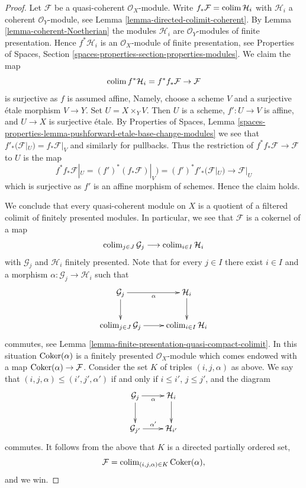 \begin{proof}
Let $\mathcal{F}$ be a quasi-coherent $\mathcal{O}_X$-module.
Write $f_*\mathcal{F} = \mathop{\mathrm{colim}}\nolimits \mathcal{H}_i$ with $\mathcal{H}_i$
a coherent $\mathcal{O}_Y$-module, see
Lemma \ref{lemma-directed-colimit-coherent}.
By Lemma \ref{lemma-coherent-Noetherian} the modules $\mathcal{H}_i$
are $\mathcal{O}_Y$-modules of finite presentation. Hence
$f^*\mathcal{H}_i$ is an $\mathcal{O}_X$-module of finite presentation, see
Properties of Spaces, Section
\ref{spaces-properties-section-properties-modules}.
We claim the map
$$
\mathop{\mathrm{colim}}\nolimits f^*\mathcal{H}_i = f^*f_*\mathcal{F} \to \mathcal{F}
$$
is surjective as $f$ is assumed affine, Namely, choose
a scheme $V$ and a surjective \'etale morphism $V \to Y$. Set
$U = X \times_Y V$. Then $U$ is a scheme, $f' : U \to V$ is affine, and
$U \to X$ is surjective \'etale. By
Properties of Spaces, Lemma
\ref{spaces-properties-lemma-pushforward-etale-base-change-modules}
we see that $f'_*(\mathcal{F}|_U) = f_*\mathcal{F}|_V$ and similarly
for pullbacks. Thus the restriction of $f^*f_*\mathcal{F} \to \mathcal{F}$
to $U$ is the map
$$
f^*f_*\mathcal{F}|_U = (f')^*(f_*\mathcal{F})|_V) =
(f')^*f'_*(\mathcal{F}|_U) \to \mathcal{F}|_U
$$
which is surjective as $f'$ is an affine morphism of schemes.
Hence the claim holds.

\medskip\noindent
We conclude that every quasi-coherent module on $X$ is a quotient of a
filtered colimit of finitely presented modules. In particular, we see that
$\mathcal{F}$ is a cokernel of a map
$$
\mathop{\mathrm{colim}}\nolimits_{j \in J} \mathcal{G}_j \longrightarrow \mathop{\mathrm{colim}}\nolimits_{i \in I} \mathcal{H}_i
$$
with $\mathcal{G}_j$ and $\mathcal{H}_i$ finitely presented. Note
that for every $j \in I$ there exist $i \in I$ and a morphism
$\alpha : \mathcal{G}_j \to \mathcal{H}_i$ such that
$$
\xymatrix{
\mathcal{G}_j \ar[r]_\alpha \ar[d] & \mathcal{H}_i \ar[d] \\
\colim_{j \in J} \mathcal{G}_j \ar[r] &
\colim_{i \in I} \mathcal{H}_i
}
$$
commutes, see
Lemma \ref{lemma-finite-presentation-quasi-compact-colimit}.
In this situation $\mathop{\mathrm{Coker}}(\alpha)$ is a finitely presented
$\mathcal{O}_X$-module which comes endowed with a map
$\mathop{\mathrm{Coker}}(\alpha) \to \mathcal{F}$. Consider the set $K$ of
triples $(i, j, \alpha)$ as above. We say that
$(i, j, \alpha) \leq (i', j', \alpha')$ if and only if
$i \leq i'$, $j \leq j'$, and the diagram
$$
\xymatrix{
\mathcal{G}_j \ar[r]_\alpha \ar[d] & \mathcal{H}_i \ar[d] \\
\mathcal{G}_{j'} \ar[r]^{\alpha'} &
\mathcal{H}_{i'}
}
$$
commutes. It follows from the above that $K$ is
a directed partially ordered set,
$$
\mathcal{F} = \mathop{\mathrm{colim}}\nolimits_{(i, j, \alpha) \in K} \mathop{\mathrm{Coker}}(\alpha),
$$
and we win.
\end{proof}






